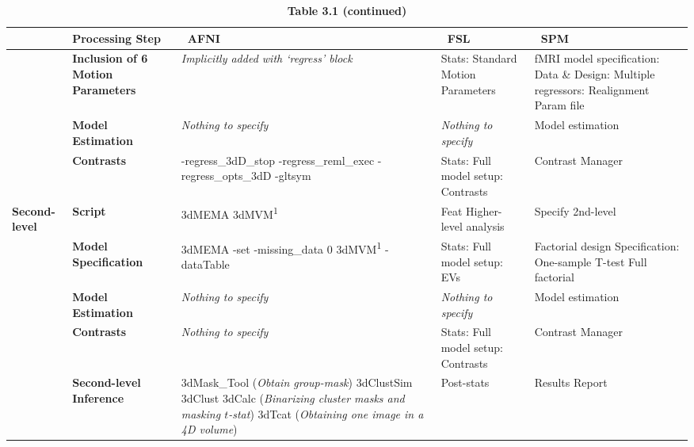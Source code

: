 \begin{onehalfspace}
\begin{table}[htbp]
\hspace*{-1.5cm}
\begin{threeparttable}
\caption*{\textbf{Table 3.1 (continued)}}
\centering
\footnotesize
\begin{tabular}{@{}p{}*{4}{L{\tabcolsep\relax}}@{}}
\toprule
& \textbf{Processing Step} & \ \textbf{AFNI} & \ \textbf{FSL} & \ \textbf{SPM} \\
\midrule
& \textbf{Inclusion of 6 Motion Parameters} & \textit{Implicitly added with `regress' block} & Stats: Standard Motion Parameters & fMRI model specification: Data \& Design: Multiple regressors: Realignment Param file \\
\cmidrule(lr){2-5}
& \textbf{Model Estimation} & \textit{Nothing to specify} & \textit{Nothing to specify} & Model estimation\\
 \cmidrule(lr){2-5}
 & \textbf{Contrasts} & -regress\_3dD\_stop -regress\_reml\_exec -regress\_opts\_3dD -gltsym & Stats: Full model setup: Contrasts & Contrast Manager \\
 \midrule
 \textbf{Second-level} & \textbf{Script} & 3dMEMA \linebreak 3dMVM\textsuperscript{1} & Feat Higher-level analysis & Specify 2nd-level\\
 \cmidrule(lr){2-5}
 & \textbf{Model Specification} & 3dMEMA \linebreak -set \linebreak -missing\_data 0 \linebreak 3dMVM\textsuperscript{1} \linebreak -dataTable & Stats: Full model setup: EVs & Factorial design Specification: One-sample T-test \linebreak Full factorial \\
  \cmidrule(lr){2-5}
& \textbf{Model Estimation} & \textit{Nothing to specify} & \textit{Nothing to specify} & Model estimation \\
\cmidrule(lr){2-5}
& \textbf{Contrasts} & \textit{Nothing to specify} & Stats: Full model setup: Contrasts & Contrast Manager \\
\cmidrule(lr){2-5}
& \textbf{Second-level Inference} & 3dMask\_Tool (\textit{Obtain group-mask}) \linebreak 3dClustSim \linebreak 3dClust \linebreak 3dCalc (\textit{Binarizing cluster masks and masking $t$-stat}) \linebreak 3dTcat (\textit{Obtaining one image in a 4D volume}) & Post-stats & Results Report \\

\end{tabular}
\end{threeparttable}
\end{table}
\end{onehalfspace}
